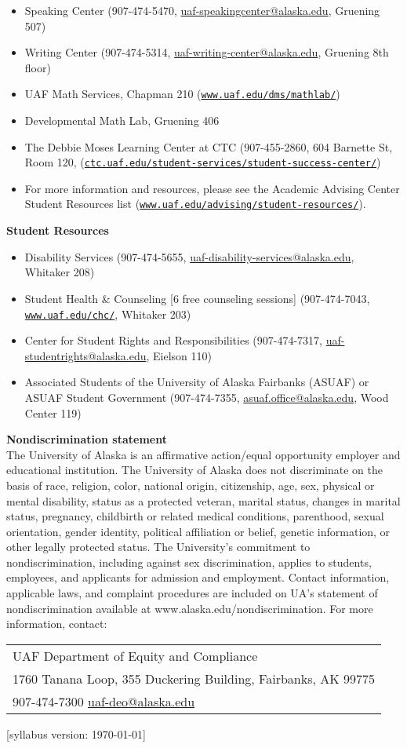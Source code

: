 \documentclass[12pt]{article}
\renewcommand{\emph}[1]{\textsf{\textbf{#1}}}
\def\mailto#1{\href{mailto:#1}{#1}}
\newcommand{\localhead}[1]{\par\smallskip\textbf{#1} \smallskip\nobreak\\}%
\def\subheading#1{\localhead{\emph{#1}}}
\begin{document}
\vspace{-7mm}
\begin{itemize}
\item Speaking Center (907-474-5470, \mailto{uaf-speakingcenter@alaska.edu}, Gruening 507)
\item Writing Center (907-474-5314, \mailto{uaf-writing-center@alaska.edu}, Gruening 8th floor)
\item UAF Math Services, Chapman 210 (\href{http://www.uaf.edu/dms/mathlab/}{\texttt{www.uaf.edu/dms/mathlab/}})
\item Developmental Math Lab, Gruening 406
\item The Debbie Moses Learning Center at CTC (907-455-2860, 604 Barnette St, Room 120, (\href{https://www.ctc.uaf.edu/student-services/student-success-center/}{\texttt{ctc.uaf.edu/student-services/student-success-center/}})
\item For more information and resources, please see the Academic Advising Center Student Resources list (\href{https://www.uaf.edu/advising/student-resources/}{\texttt{www.uaf.edu/advising/student-resources/}}).
\end{itemize}

\subheading{Student Resources}

\vspace{-7mm}
\begin{itemize}
\item Disability Services (907-474-5655, \mailto{uaf-disability-services@alaska.edu}, Whitaker 208)
\item Student Health \& Counseling [6 free counseling sessions] (907-474-7043, \href{https://www.uaf.edu/chc/}{\texttt{www.uaf.edu/chc/}}, Whitaker 203)
\item Center for Student Rights and Responsibilities (907-474-7317, \mailto{uaf-studentrights@alaska.edu}, Eielson 110)
\item Associated Students of the University of Alaska Fairbanks (ASUAF) or ASUAF Student Government (907-474-7355, \mailto{asuaf.office@alaska.edu}, Wood Center 119)
\end{itemize}

\subheading{Nondiscrimination statement}
The University of Alaska is an affirmative action/equal opportunity employer and educational institution. The University of Alaska does not discriminate on the basis of race, religion, color, national origin, citizenship, age, sex, physical or mental disability, status as a protected veteran, marital status, changes in marital status, pregnancy, childbirth or related medical conditions, parenthood, sexual orientation, gender identity, political affiliation or belief, genetic information, or other legally protected status. The University's commitment to nondiscrimination, including against sex discrimination, applies to students, employees, and applicants for admission and employment. Contact information, applicable laws, and complaint procedures are included on UA's statement of nondiscrimination available at www.alaska.edu/nondiscrimination. For more information, contact:

\begin{tabular}{l}
UAF Department of Equity and Compliance\\
1760 Tanana Loop, 355 Duckering Building, Fairbanks, AK  99775\\
907-474-7300 \quad \mailto{uaf-deo@alaska.edu}
\end{tabular}

\hfill  \scriptsize [syllabus version: \today] \normalsize
\end{document}
